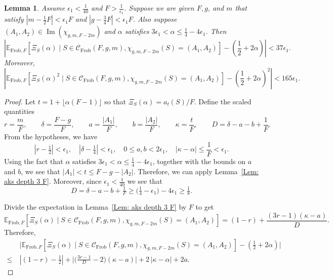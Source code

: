 \documentclass[12pt]{amsart}
\def\E{{\mathbb E}}
\newcommand{\cC}{\mathcal{C}}
\def\Ima{{\operatorname{Im}}}
\newcommand{\Frob}{\text{Frob}}
\newtheorem{lemma}[theorem]{Lemma}
\begin{document}
\begin{lemma}\label{Lem: depth 3 fix A1 A2 by Frob}
Assume $\epsilon_1< \frac{1}{40}$ and $F>\frac{1}{\epsilon_1}$.
Suppose we are given $F,g$, and $m$ that satisfy $|m-\frac{1}{2}F|<\epsilon_1 F$ and $|g-\frac{3}{4}F|<\epsilon_1 F$.
Also suppose $(A_1,A_2)\in \Ima(\chi_{g,m,F-2m})$ and $\alpha$ satisfies $3\epsilon_1<\alpha\le \frac{1}{4}-4\epsilon_1$.
Then
\[
\left|\E_{\Frob,F} \left[\Xi_S(\alpha)\mid S\in \cC_{\Frob}(F,g,m), \chi_{g,m,F-2m}(S)=(A_1,A_2) \right]-\left(\frac{1}{2}+2\alpha\right)\right|
< 37\epsilon_1. 
\]
Moreover,
\[
\left|
\E_{\Frob,F} 
[\Xi_S(\alpha)^2\mid S\in \cC_{\Frob}(F,g,m), \chi_{g,m,F-2m}(S)=(A_1,A_2) ] - \left(\frac{1}{2}+2\alpha\right)^2 \right|
< 165\epsilon_1. 
\]
\end{lemma}
\begin{proof}
Let $t=1+\lfloor \alpha(F-1)\rfloor$ so that $\Xi_S(\alpha)=a_t(S)/F$. 
Define the scaled quantities
\[
r=\frac{m}{F},\qquad \delta=\frac{F-g}{F},\qquad 
a=\frac{|A_1|}{F},\qquad b=\frac{|A_2|}{F},\qquad 
\kappa=\frac{t}{F},\qquad D=\delta-a-b+\frac{1}{F}.
\]
From the hypotheses, we have 
\[
|r-\tfrac12|< \epsilon_1,\quad |\delta-\tfrac14|< \epsilon_1,\quad 
0\le a,b<  2\epsilon_1,\quad
|\kappa-\alpha|\le \frac{1}{F}<\epsilon_1.
\]
Using the fact that $\alpha$ satisfies $3\epsilon_1<\alpha\le \frac{1}{4}-4\epsilon_1$, together with the bounds on $a$ and $b$, we see that
$|A_1|<t\le F-g-|A_2|$.  Therefore, we can apply Lemma~\ref{Lem: aks depth 3 F}. 
Moreover, since $\epsilon_1<\tfrac1{40}$ we see that
\[
D=\delta-a-b+\tfrac1F \ge \big(\tfrac14-\epsilon_1\big)- 4\epsilon_1  \ge \tfrac18.
\]


Divide the expectation in Lemma~\ref{Lem: aks depth 3 F} by $F$ to get
\[
\E_{\Frob,F}\left[\Xi_S(\alpha)\mid S\in\cC_{\Frob}(F,g,m),  \chi_{g,m,F-2m}(S)=(A_1,A_2)\right]
=(1-r)+\frac{(3r-1)(\kappa-a)}{D}.
\]
Therefore,
\begin{align*}
&\ \Big| \E_{\Frob,F}\left[\Xi_S(\alpha)\mid S\in\cC_{\Frob}(F,g,m),  \chi_{g,m,F-2m}(S)=(A_1,A_2)\right] - (\tfrac12+2\alpha) \Big|\\
\leq & \ |(1-r)-\tfrac12| 
+ \Big|\Big(\tfrac{3r-1}{D}-2\Big)(\kappa-a)\Big|
+ 2\,|\kappa-\alpha| + 2a. 
\end{align*}



\end{proof}
\end{document}

